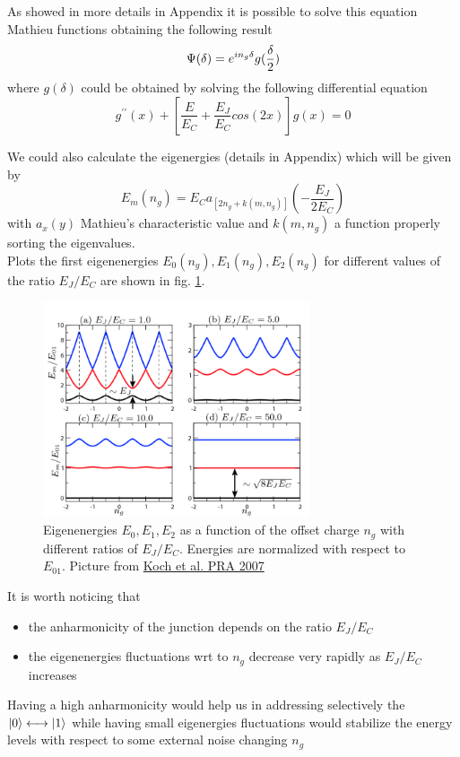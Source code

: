 As showed in more details in Appendix it is possible to solve this equation Mathieu functions obtaining the following result
\begin{equation}
    \Psi(\delta) = e^{in_g\delta}g(\frac{\delta}{2})\\
\end{equation}
where $g(\delta)$ could be obtained by solving the following differential equation
\begin{equation}
    g^{\prime\prime}(x) + [\frac{E}{E_C} + \frac{E_J}{E_C}cos(2x)]g(x) = 0
\end{equation}

We could also calculate the eigenergies (details in Appendix) which will  be given by
\begin{equation}
    E_m(n_g) = E_Ca_{[2n_g+k(m,n_g)]}(-\frac{E_J}{2E_C})
\end{equation}
with $a_x(y)$ Mathieu's characteristic value and $k(m,n_g)$ a function properly sorting the eigenvalues.\\
Plots the first eigenenergies $E_0(n_g), E_1(n_g),E_2(n_g)$ for different values of the ratio $E_J/E_C$ are shown in fig. \ref{fig:transmon}. 
\begin{figure}[h]
\centering
\includegraphics[width=0.7\textwidth]{pic/transmon/jj4.png}
\caption{Eigenenergies $E_0, E_1,E_2$ as a function of the offset charge  $n_g$ with different ratios of $E_J/E_C$. Energies are normalized with respect to $E_{01}$. Picture from \href{https://doi.org/10.1103/PhysRevA.76.042319}{Koch et al. PRA 2007}}
\label{fig:transmon}
\end{figure}

It is worth noticing that
\begin{itemize}
    \item the anharmonicity of the junction depends on the ratio $E_J/E_C$
    \item the eigenenergies fluctuations wrt to $n_g$ decrease very rapidly as $E_J/E_C$ increases
\end{itemize}
Having a high anharmonicity would help us in addressing selectively the $\ket{0} \longleftrightarrow \ket{1}$ while having small eigenergies fluctuations would stabilize the energy levels with respect to some external noise changing $n_g$


